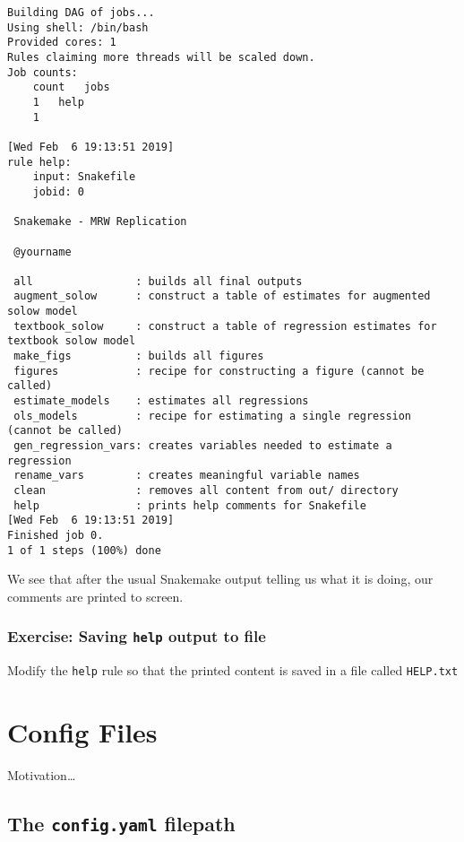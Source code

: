 \documentclass[]{book}
\theoremstyle{definition}
\theoremstyle{definition}
\theoremstyle{definition}
\theoremstyle{remark}
\begin{document}
\begin{verbatim}
Building DAG of jobs...
Using shell: /bin/bash
Provided cores: 1
Rules claiming more threads will be scaled down.
Job counts:
    count   jobs
    1   help
    1

[Wed Feb  6 19:13:51 2019]
rule help:
    input: Snakefile
    jobid: 0

 Snakemake - MRW Replication

 @yourname

 all                : builds all final outputs
 augment_solow      : construct a table of estimates for augmented solow model
 textbook_solow     : construct a table of regression estimates for textbook solow model
 make_figs          : builds all figures
 figures            : recipe for constructing a figure (cannot be called)
 estimate_models    : estimates all regressions
 ols_models         : recipe for estimating a single regression (cannot be called)
 gen_regression_vars: creates variables needed to estimate a regression
 rename_vars        : creates meaningful variable names
 clean              : removes all content from out/ directory
 help               : prints help comments for Snakefile
[Wed Feb  6 19:13:51 2019]
Finished job 0.
1 of 1 steps (100%) done
\end{verbatim}

We see that after the usual Snakemake output telling us what it is
doing, our comments are printed to screen.

\subsection*{\texorpdfstring{Exercise: Saving \texttt{help} output to
file}{Exercise: Saving help output to file}}\label{exercise-saving-help-output-to-file}

Modify the \texttt{help} rule so that the printed content is saved in a
file called \texttt{HELP.txt}

\chapter{Config Files}\label{config-files}

Motivation\ldots{}

\section{\texorpdfstring{The \texttt{config.yaml}
filepath}{The config.yaml filepath}}\label{the-config.yaml-filepath}
\end{document}
